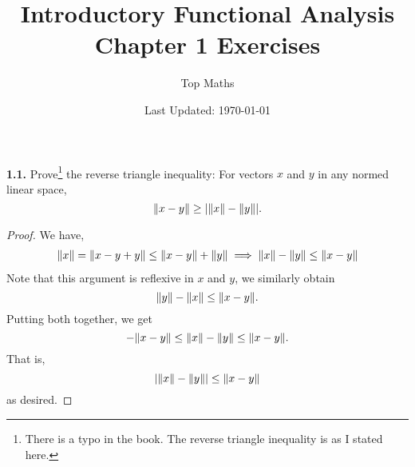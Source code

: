 \documentclass[12pt]{article}
\title{Introductory Functional Analysis \\ Chapter 1 Exercises}
\date{Last Updated: \today}
\author{Top Maths}
\theoremstyle{definition}
\begin{document}
	\maketitle 
	
	\noindent \textbf{1.1.} Prove\footnote{There is a typo in the book. The reverse triangle inequality is as I stated here.} the reverse triangle inequality: For vectors $x$ and $y$ in any normed linear space, $$\norm{x - y} \geq \abs{\norm{x} - \norm{y}}.$$
		\begin{proof}
			We have,
				\begin{align*}
					\norm{x} = \norm{x - y + y} \leq \norm{x - y} + \norm{y} \implies \norm{x} - \norm{y} \leq \norm{x - y}
				\end{align*}
			Note that this argument is reflexive in $x$ and $y$, we similarly obtain $$\norm{y} - \norm{x} \leq \norm{x - y}.$$ Putting both together, we get $$- \norm{x - y} \leq \norm{x} - \norm{y} \leq \norm{x - y}.$$ That is, $$|\norm{x} - \norm{y}| \leq \norm{x - y}$$ as desired. 
		\end{proof}
	
\end{document}
